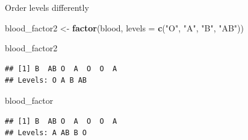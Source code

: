 \documentclass[ignorenonframetext,]{beamer}
\newenvironment{Shaded}{\begin{snugshade}}{\end{snugshade}}
\newcommand{\DataTypeTok}[1]{\textcolor[rgb]{0.13,0.29,0.53}{#1}}
\newcommand{\KeywordTok}[1]{\textcolor[rgb]{0.13,0.29,0.53}{\textbf{#1}}}
\newcommand{\NormalTok}[1]{#1}
\newcommand{\StringTok}[1]{\textcolor[rgb]{0.31,0.60,0.02}{#1}}
\begin{document}
\begin{frame}[fragile]{Order levels differently}
\protect\hypertarget{order-levels-differently}{}

\begin{Shaded}
\begin{Highlighting}[]
\NormalTok{blood_factor2 <-}\StringTok{ }\KeywordTok{factor}\NormalTok{(blood,}
                    \DataTypeTok{levels =} \KeywordTok{c}\NormalTok{(}\StringTok{"O"}\NormalTok{, }\StringTok{"A"}\NormalTok{, }\StringTok{"B"}\NormalTok{, }\StringTok{"AB"}\NormalTok{))}

\NormalTok{blood_factor2}
\end{Highlighting}
\end{Shaded}

\begin{verbatim}
## [1] B  AB O  A  O  O  A 
## Levels: O A B AB
\end{verbatim}

\begin{Shaded}
\begin{Highlighting}[]
\NormalTok{blood_factor}
\end{Highlighting}
\end{Shaded}

\begin{verbatim}
## [1] B  AB O  A  O  O  A 
## Levels: A AB B O
\end{verbatim}

\end{frame}
\end{document}
